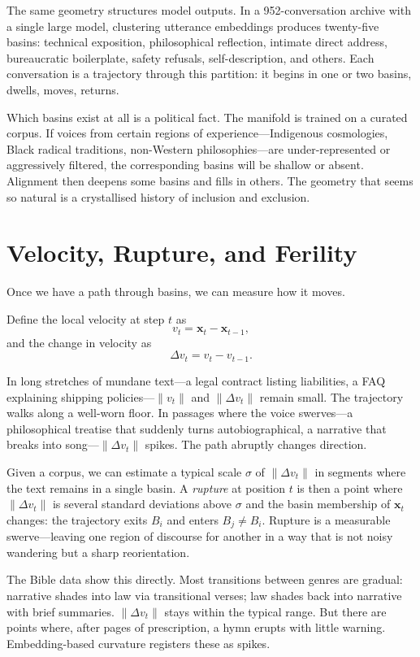 \documentclass[12pt,a4paper]{article}
\begin{document}
The same geometry structures model outputs. In a 952-conversation archive with a single large model, clustering utterance embeddings produces twenty-five basins: technical exposition, philosophical reflection, intimate direct address, bureaucratic boilerplate, safety refusals, self-description, and others. Each conversation is a trajectory through this partition: it begins in one or two basins, dwells, moves, returns.

Which basins exist at all is a political fact. The manifold is trained on a curated corpus. If voices from certain regions of experience---Indigenous cosmologies, Black radical traditions, non-Western philosophies---are under-represented or aggressively filtered, the corresponding basins will be shallow or absent. Alignment then deepens some basins and fills in others. The geometry that seems so natural is a crystallised history of inclusion and exclusion.

\section{Velocity, Rupture, and Ferility}

Once we have a path through basins, we can measure how it moves.

Define the local velocity at step $t$ as
\[
v_t = \mathbf{x}_t - \mathbf{x}_{t-1},
\]
and the change in velocity as
\[
\Delta v_t = v_t - v_{t-1}.
\]

In long stretches of mundane text---a legal contract listing liabilities, a FAQ explaining shipping policies---$\|v_t\|$ and $\|\Delta v_t\|$ remain small. The trajectory walks along a well-worn floor. In passages where the voice swerves---a philosophical treatise that suddenly turns autobiographical, a narrative that breaks into song---$\|\Delta v_t\|$ spikes. The path abruptly changes direction.

Given a corpus, we can estimate a typical scale $\sigma$ of $\|\Delta v_t\|$ in segments where the text remains in a single basin. A \emph{rupture} at position $t$ is then a point where $\|\Delta v_t\|$ is several standard deviations above $\sigma$ and the basin membership of $\mathbf{x}_t$ changes: the trajectory exits $B_i$ and enters $B_j \ne B_i$. Rupture is a measurable swerve---leaving one region of discourse for another in a way that is not noisy wandering but a sharp reorientation.

The Bible data show this directly. Most transitions between genres are gradual: narrative shades into law via transitional verses; law shades back into narrative with brief summaries. $\|\Delta v_t\|$ stays within the typical range. But there are points where, after pages of prescription, a hymn erupts with little warning. Embedding-based curvature registers these as spikes.
\end{document}
